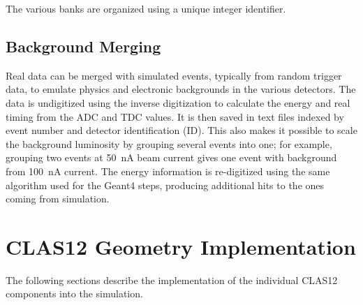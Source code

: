 The various banks are organized using a unique integer identifier.

\subsection{Background Merging}
\label{bmerging}

Real data can be merged with simulated events, typically from random trigger data, to emulate physics and electronic
backgrounds in the various detectors. The data is undigitized using the inverse digitization to calculate the energy and
real timing from the ADC and TDC values. It is then saved in text files indexed by event number and detector
identification (ID). This also makes it possible to scale the background luminosity by grouping several events into one;
for example, grouping two events at 50~nA beam current gives one event with background from 100~nA current. The
energy information is re-digitized using the same algorithm used for the Geant4 steps, producing additional hits to the
ones coming from simulation.

\section{CLAS12 Geometry Implementation}

The following sections describe the implementation of the individual CLAS12 components into the simulation.
